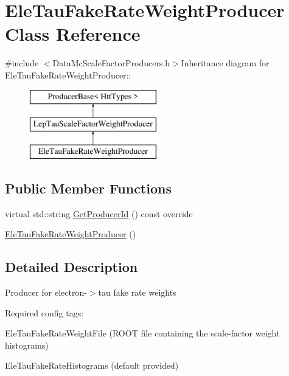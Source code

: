 \hypertarget{classEleTauFakeRateWeightProducer}{
\section{EleTauFakeRateWeightProducer Class Reference}
\label{classEleTauFakeRateWeightProducer}
}


{\ttfamily \#include $<$DataMcScaleFactorProducers.h$>$}Inheritance diagram for EleTauFakeRateWeightProducer::\begin{figure}[H]
\begin{center}
\leavevmode
\includegraphics[height=3cm]{classEleTauFakeRateWeightProducer}
\end{center}
\end{figure}
\subsection*{Public Member Functions}
\begin{DoxyCompactItemize}
\item 
virtual std::string \hyperlink{classEleTauFakeRateWeightProducer_a875ef79a66349532388a526b6df0b4c7}{GetProducerId} () const override
\item 
\hyperlink{classEleTauFakeRateWeightProducer_af5e10aac40d7916caa5d7e006dee6986}{EleTauFakeRateWeightProducer} ()
\end{DoxyCompactItemize}


\subsection{Detailed Description}
Producer for electron-\/$>$tau fake rate weights

Required config tags:
\begin{DoxyItemize}
\item EleTauFakeRateWeightFile (ROOT file containing the scale-\/factor weight histograms)
\item EleTauFakeRateHistograms (default provided) 
\end{DoxyItemize}

